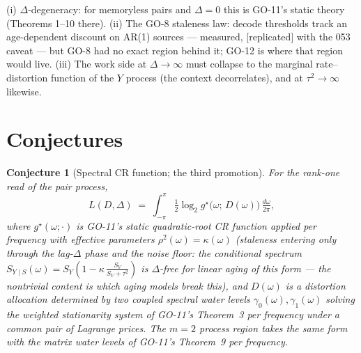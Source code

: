 ﻿\documentclass[11pt]{article}
\newtheorem{conjecture}{Conjecture}
\theoremstyle{remark}
\begin{document}
(i) $\Delta$-degeneracy: for memoryless pairs and $\Delta=0$ this is
GO-11's static theory (Theorems 1--10 there). (ii) The GO-8 staleness
law: decode thresholds track an age-dependent discount on AR(1) sources
--- measured, $[$replicated$]$ with the 053 caveat --- but GO-8 had no
exact region behind it; GO-12 is where that region would live. (iii) The
work side at $\Delta\to\infty$ must collapse to the marginal
rate--distortion function of the $Y$ process (the context decorrelates),
and at $\tau^2\to\infty$ likewise.

\section{Conjectures}

\begin{conjecture}[Spectral CR function; the third promotion]
\label{conj:spectral}
For the rank-one read of the pair process,
\[
L(D,\Delta)\;=\;\int_{-\pi}^{\pi}\tfrac12\log_2
g^\star\!\bigl(\omega;\,D(\omega)\bigr)\,\tfrac{d\omega}{2\pi},
\]
where $g^\star(\omega;\cdot)$ is GO-11's static quadratic-root CR
function applied per frequency with effective parameters
$\rho^2(\omega)=\kappa(\omega)$ (staleness entering only through the
lag-$\Delta$ phase and the noise floor: the conditional spectrum
$S_{Y\mid S}(\omega)=S_Y(1-\kappa\,\tfrac{S_V}{S_V+\tau^2})$ is
$\Delta$-free for linear aging of this form --- the nontrivial content
is which \emph{aging models} break this), and $D(\omega)$ is a
distortion allocation determined by \emph{two coupled spectral water
levels} $\gamma_0(\omega),\gamma_1(\omega)$ solving the weighted
stationarity system of GO-11's Theorem~3 per frequency under a common
pair of Lagrange prices. The $m=2$ process region takes the same form
with the matrix water levels of GO-11's Theorem~9 per frequency.
\end{conjecture}
\end{document}
